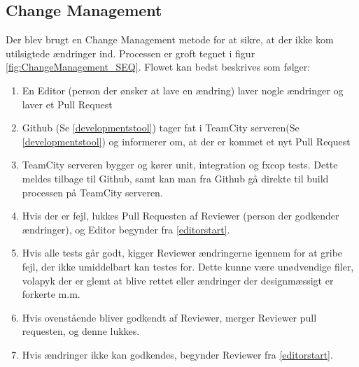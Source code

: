 \subsection{Change Management}
Der blev brugt en Change Management metode for at sikre, at der ikke kom utilsigtede ændringer ind. Processen er groft tegnet i figur \ref{fig:ChangeManagement_SEQ}. Flowet kan bedst beskrives som følger:
\begin{enumerate}[label=\arabic{enumi}.,ref=\arabic{enumi}]
  \item \label{editorstart} En Editor (person der ønsker at lave en ændring) laver nogle ændringer og laver et Pull Request
  \item Github (Se \ref{developmentstool}) tager fat i TeamCity serveren(Se \ref{developmentstool}) og informerer om, at der er kommet et nyt Pull Request
  \item TeamCity serveren bygger og kører unit, integration og fxcop tests. Dette meldes tilbage til Github, samt kan man fra Github gå direkte til build processen på TeamCity serveren.
  \item Hvis der er fejl, lukkes Pull Requesten af Reviewer (person der godkender ændringer), og Editor begynder fra \ref{editorstart}.
  \item Hvis alle tests går godt, kigger Reviewer ændringerne igennem for at gribe fejl, der ikke umiddelbart kan testes for. Dette kunne være unødvendige filer, volapyk der er glemt at blive rettet eller ændringer der designmæssigt er forkerte m.m.
  \item Hvis ovenstående bliver godkendt af Reviewer, merger Reviewer pull requesten, og denne lukkes.
  \item Hvis ændringer ikke kan godkendes, begynder Reviewer fra \ref{editorstart}.
\end{enumerate}

